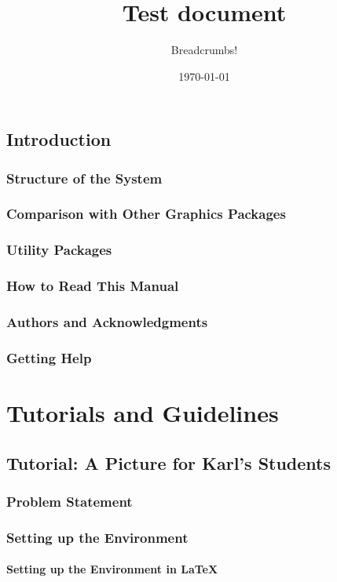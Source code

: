 \documentclass{memoir}
\title{Test document}
\author{Breadcrumbs!}
\date{\today}
\begin{document}
\maketitle
\tableofcontents
\chapter{Introduction}
\lipsum
\section{Structure of the System}
\lipsum
\section{Comparison with Other Graphics Packages}
\lipsum
\section{Utility Packages}
\lipsum
\section{How to Read This Manual}
\lipsum
\section{Authors and Acknowledgments}
\lipsum
\section{Getting Help}
\lipsum
\part{Tutorials and Guidelines}
\chapter{Tutorial: A Picture for Karl's Students}
\lipsum
\section{Problem Statement}
\lipsum
\section{Setting up the Environment}
\lipsum
\subsection{Setting up the Environment in \LaTeX}
\lipsum
\end{document}
